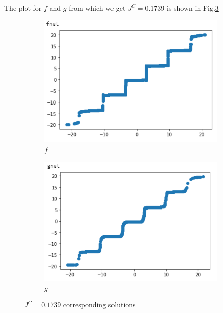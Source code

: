 \documentclass[conference,compsoc]{IEEEtran}
\begin{document}
  The plot for $f$ and $g$ from which we get $J^C=$0.1739 is shown in Fig.\ref{fig:$J^C=0.1739$ corresponding solutions}
  \begin{figure}
    \centering
        \begin{subfigure}[b]{0.2\textwidth}            
                \includegraphics[width=\textwidth]{images/f_update_2_best.png}
                \caption{$f$}
                \label{fig:f_update_2_best}
        \end{subfigure}%
        \begin{subfigure}[b]{0.2\textwidth}
                \centering
                \includegraphics[width=\textwidth]{images/g_update_2_best.png}
                \caption{$g$}
                \label{fig:g_update_2_best}
        \end{subfigure}
        \caption{$J^C=0.1739$ corresponding solutions}\label{fig:$J^C=0.1739$ corresponding solutions}
    \end{figure}
  
\end{document}
